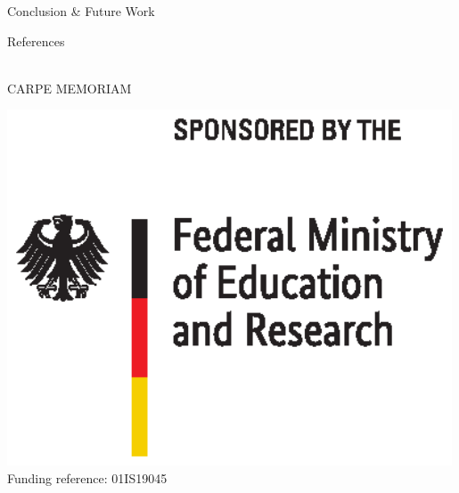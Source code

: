 \documentclass[final,hyperref={pdfpagelabels=false}]{beamer}
\begin{document}
\begin{frame}
\begin{block}{Conclusion \& Future Work}
\begin{minipage}{0.95\paperwidth}
\end{minipage}
\end{block}

\begin{minipage}{0.65\paperwidth}
\begin{block}{References}
\begin{minipage}{0.95\textwidth}

{\tiny
}
\end{minipage}
\end{block}
\end{minipage}
\hspace{4mm}
\begin{minipage}{0.31\paperwidth}
\vspace{2cm}
\begin{minipage}[t][][t]{0.3\textwidth}
\centering
\vspace{8pt}
\\ 
\vspace*{10pt}
\tiny{CARPE MEMORIAM}
\vspace{1cm}
\end{minipage}
\begin{minipage}[t][][t]{0.35\textwidth}
\centering
\vspace{0pt}
\includegraphics[width=0.99\textwidth]{pics/BMBF_gefoerdert_2017_en}
\tiny Funding reference: 01IS19045
\end{minipage}
\begin{minipage}[t][][t]{0.25\textwidth}

\end{minipage}
\end{minipage}
\end{frame}
\end{document}
